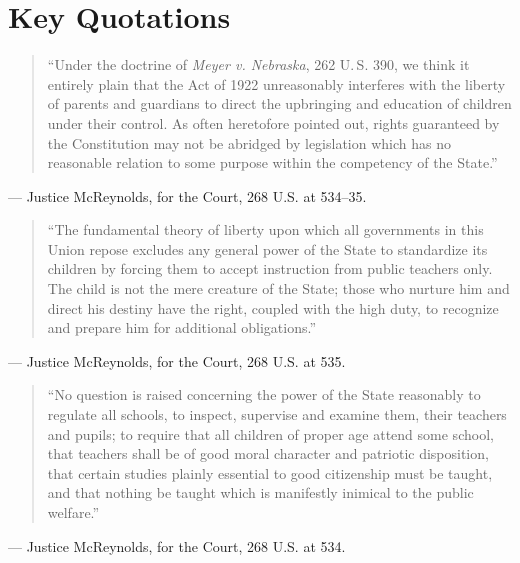 \documentclass[12pt]{article}
\begin{document}
\section{Key Quotations}

\begin{quote}
``Under the doctrine of \textit{Meyer v. Nebraska}, 262 U.\,S. 390, we think it entirely plain that the Act of 1922 unreasonably interferes with the liberty of parents and guardians to direct the upbringing and education of children under their control. As often heretofore pointed out, rights guaranteed by the Constitution may not be abridged by legislation which has no reasonable relation to some purpose within the competency of the State.''
\end{quote}
\noindent --- Justice McReynolds, for the Court, 268 U.S. at 534--35.

\begin{quote}
``The fundamental theory of liberty upon which all governments in this Union repose excludes any general power of the State to standardize its children by forcing them to accept instruction from public teachers only. The child is not the mere creature of the State; those who nurture him and direct his destiny have the right, coupled with the high duty, to recognize and prepare him for additional obligations.''
\end{quote}
\noindent --- Justice McReynolds, for the Court, 268 U.S. at 535.

\begin{quote}
``No question is raised concerning the power of the State reasonably to regulate all schools, to inspect, supervise and examine them, their teachers and pupils; to require that all children of proper age attend some school, that teachers shall be of good moral character and patriotic disposition, that certain studies plainly essential to good citizenship must be taught, and that nothing be taught which is manifestly inimical to the public welfare.''
\end{quote}
\noindent --- Justice McReynolds, for the Court, 268 U.S. at 534.
\end{document}
